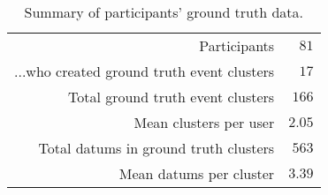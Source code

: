 \begin{table}[htp]
	\begin{center}
	\caption{Summary of participants' ground truth data.}
	\label{tab:table_gt_summary}
		\begin{tabular}{r r}
		\toprule
			Participants & $81$\\
			...who created ground truth event clusters & $17$\\
			Total ground truth event clusters & $166$\\
			Mean clusters per user & $2.05$\\
			Total datums in ground truth clusters & $563$\\
			Mean datums per cluster & $3.39$\\
		\bottomrule
		\end{tabular}
	\end{center}
\end{table}